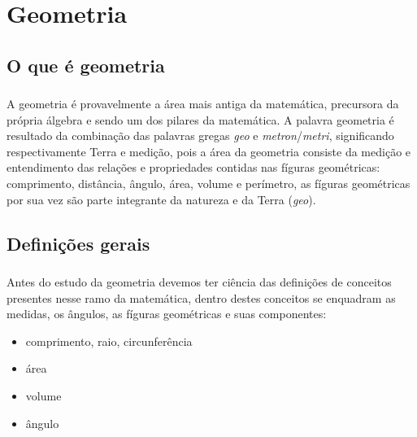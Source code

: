 \documentclass[handout]{beamer}
\begin{document}

\section{Geometria}
\subsection{O que é geometria}
\begin{frame}\frametitle{\subsecname}
    A geometria é provavelmente a área mais antiga da matemática, precursora da própria álgebra e sendo um dos pilares
    da matemática. A palavra geometria é resultado da combinação das palavras gregas \textit{geo} e
    \textit{metron}/\textit{metri}, significando respectivamente Terra e medição, pois a área da geometria consiste da
    medição e entendimento das relações e propriedades  contidas nas fíguras geométricas: comprimento, distância, ângulo,
    área, volume e perímetro, as fíguras geométricas por sua vez são parte integrante da natureza e da Terra (\textit{geo}).
\end{frame}


\subsection{Definições gerais}
\begin{frame}\frametitle{\subsecname}
    Antes do estudo da geometria devemos ter ciência das definições de conceitos presentes nesse ramo da matemática,
    dentro destes conceitos se enquadram as medidas, os ângulos, as fíguras geométricas e suas componentes:
    \begin{itemize}
        \item comprimento, raio, circunferência
        \item área
        \item volume
        \item ângulo
    \end{itemize}
\end{frame}

\end{document}
